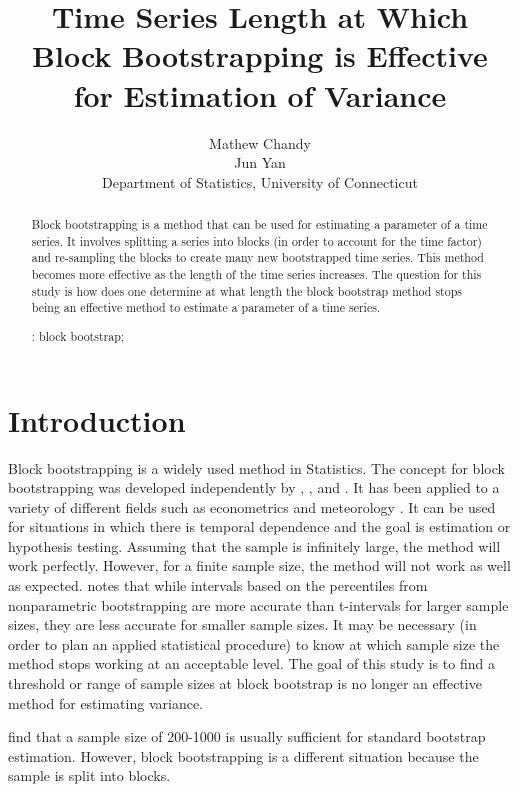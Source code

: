 \documentclass[12pt, letterpaper, titlepage]{article}
\title{Time Series Length at Which Block Bootstrapping is Effective for Estimation of Variance}
\author{Mathew Chandy\\
  Jun Yan\\[1ex]
  Department of Statistics, University of Connecticut\\
}
\date{}
\begin{document}
 
\maketitle

\doublespace

\begin{abstract}
Block bootstrapping is a method that can be used for estimating a parameter of a time
series. It involves splitting a series into blocks (in order to account for the time
factor) and re-sampling the blocks to create many new bootstrapped time series.
This method becomes more effective as the length of the time series increases. 
The question for this study is how does one determine at what length the block
bootstrap method stops being an effective method to estimate a parameter of a time
series.

\bigskip
\noindent{}:
block bootstrap;
\end{abstract}

\section{Introduction}
\label{sec:intro}

Block bootstrapping is a widely used method in Statistics. The concept for block 
bootstrapping was developed independently by \citet{hall1985resampling}, \citet{carlstein1986use}, and 
\citet{kunsch1989jackknife}. \citet{radovanov2014comparison} It has been applied to a variety of 
different fields such 
as econometrics \citep{mackinnon2006bootstrap} and meteorology \citep{varga2017generalised}. It can be used for 
situations in which there is temporal dependence and the goal is estimation or hypothesis 
testing. Assuming that the sample is infinitely 
large, the method will work perfectly. However, for a finite sample size, the method will 
not work as well as expected. \citet{hesterberg2015teachers} notes that while intervals based on the percentiles from nonparametric bootstrapping are more accurate than t-intervals for larger sample sizes, they are less accurate for smaller sample sizes. It may be necessary (in order to plan an applied 
statistical 
procedure) to know at which sample size the method stops working at an acceptable level. 
The goal of this study is to find a threshold or range of sample sizes at block bootstrap 
is no longer an effective method for estimating variance.


\citet{nevitt2001performance} find that a sample size of 200-1000 is usually sufficient for standard 
bootstrap estimation. However, block bootstrapping is a different situation because the 
sample is split into blocks.
\end{document}
